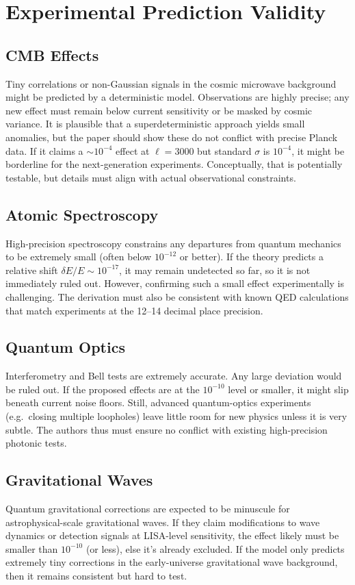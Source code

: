 \documentclass[11pt]{article}
\begin{document}
\section{Experimental Prediction Validity}

\subsection{CMB Effects}
Tiny correlations or non-Gaussian signals in the cosmic microwave background might be predicted by a deterministic model. Observations are highly precise; any new effect must remain below current sensitivity or be masked by cosmic variance. It is plausible that a superdeterministic approach yields small anomalies, but the paper should show these do not conflict with precise Planck data. If it claims a $\sim 10^{-4}$ effect at $\ell=3000$ but standard $\sigma$ is $10^{-4}$, it might be borderline for the next-generation experiments. Conceptually, that is potentially testable, but details must align with actual observational constraints.

\subsection{Atomic Spectroscopy}
High-precision spectroscopy constrains any departures from quantum mechanics to be extremely small (often below $10^{-12}$ or better). If the theory predicts a relative shift $\delta E/E \sim 10^{-17}$, it may remain undetected so far, so it is not immediately ruled out. However, confirming such a small effect experimentally is challenging. The derivation must also be consistent with known QED calculations that match experiments at the 12--14 decimal place precision.

\subsection{Quantum Optics}
Interferometry and Bell tests are extremely accurate. Any large deviation would be ruled out. If the proposed effects are at the $10^{-10}$ level or smaller, it might slip beneath current noise floors. Still, advanced quantum-optics experiments (e.g.\ closing multiple loopholes) leave little room for new physics unless it is very subtle. The authors thus must ensure no conflict with existing high-precision photonic tests.

\subsection{Gravitational Waves}
Quantum gravitational corrections are expected to be minuscule for astrophysical-scale gravitational waves. If they claim modifications to wave dynamics or detection signals at LISA-level sensitivity, the effect likely must be smaller than $10^{-10}$ (or less), else it's already excluded. If the model only predicts extremely tiny corrections in the early-universe gravitational wave background, then it remains consistent but hard to test. 
\end{document}
